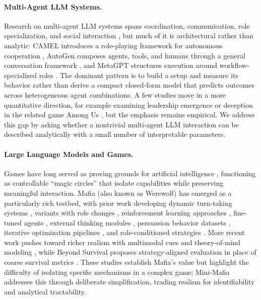 \documentclass{article}
\begin{document}
\paragraph{Multi-Agent LLM Systems.} Research on multi-agent LLM systems spans coordination, communication, role specialization, and social interaction \citep{gao2024large, guo2024large, wang2024survey, hou2024egosocialarena}, but much of it is architectural rather than analytic: CAMEL introduces a role-playing framework for autonomous cooperation \citep{li2023camel}, AutoGen composes agents, tools, and humans through a general conversation framework \citep{wu2023autogen}, and MetaGPT structures execution around workflow-specialized roles \citep{hong2023metagpt}. The dominant pattern is to build a setup and measure its behavior rather than derive a compact closed-form model that predicts outcomes across heterogeneous agent combinations. A few studies move in a more quantitative direction, for example examining leadership emergence \citep{du2024helmsman} or deception in the related game Among Us \citep{bansal2025amonus}, but the emphasis remains empirical. We address this gap by asking whether a nontrivial multi-agent LLM interaction can be described analytically with a small number of interpretable parameters.

\paragraph{Large Language Models and Games.} Games have long served as proving grounds for artificial intelligence \citep{silver2016mastering}, functioning as controllable ``magic circles'' \citep{huizinga1938homo} that isolate capabilities while preserving meaningful interaction. Mafia (also known as Werewolf) has emerged as a particularly rich testbed, with prior work developing dynamic turn-taking systems \citep{bailis2024werewolfarena}, variants with role changes \citep{jin2024onuw}, reinforcement learning approaches \citep{xu2023languageagents}, fine-tuned agents \citep{shibata2023deepwolf}, external thinking modules \citep{wu2024thinker}, persuasion behavior datasets \citep{lai2022werewolfamongus}, iterative optimization pipelines \citep{xu2025lspo}, and role-conditioned strategies \citep{nakamori2025strategy}. More recent work pushes toward richer realism with multimodal cues and theory-of-mind modeling \citep{zhang2025multimind}, while Beyond Survival proposes strategy-aligned evaluation in place of coarse survival metrics \citep{song2025beyondsurvival}. These studies establish Mafia's value but highlight the difficulty of isolating specific mechanisms in a complex game; Mini-Mafia addresses this through deliberate simplification, trading realism for identifiability and analytical tractability.
\end{document}
